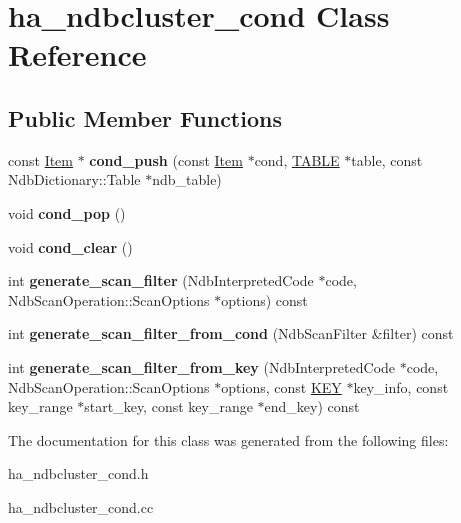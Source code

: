 \hypertarget{classha__ndbcluster__cond}{}\section{ha\+\_\+ndbcluster\+\_\+cond Class Reference}
\label{classha__ndbcluster__cond}
\subsection*{Public Member Functions}
\begin{DoxyCompactItemize}
\item 
\mbox{\label{classha__ndbcluster__cond_ae59c2d817532d16e55721ed704b60fdc}} 
const \mbox{\hyperlink{classItem}{Item}} $\ast$ {\bfseries cond\+\_\+push} (const \mbox{\hyperlink{classItem}{Item}} $\ast$cond, \mbox{\hyperlink{structTABLE}{T\+A\+B\+LE}} $\ast$table, const Ndb\+Dictionary\+::\+Table $\ast$ndb\+\_\+table)
\item 
\mbox{\label{classha__ndbcluster__cond_a492ae3d4be6468c4ab6f3a619634c87e}} 
void {\bfseries cond\+\_\+pop} ()
\item 
\mbox{\label{classha__ndbcluster__cond_a4735f773a98387b5a211580f09c86db9}} 
void {\bfseries cond\+\_\+clear} ()
\item 
\mbox{\label{classha__ndbcluster__cond_a43ef0559e01c07bc67c8c256991ad9a0}} 
int {\bfseries generate\+\_\+scan\+\_\+filter} (Ndb\+Interpreted\+Code $\ast$code, Ndb\+Scan\+Operation\+::\+Scan\+Options $\ast$options) const
\item 
\mbox{\label{classha__ndbcluster__cond_ad631c9d1eea3312afdf2eed233d138ce}} 
int {\bfseries generate\+\_\+scan\+\_\+filter\+\_\+from\+\_\+cond} (Ndb\+Scan\+Filter \&filter) const
\item 
\mbox{\label{classha__ndbcluster__cond_a2efe40a89d809bb85ac9f8d2d24479ad}} 
int {\bfseries generate\+\_\+scan\+\_\+filter\+\_\+from\+\_\+key} (Ndb\+Interpreted\+Code $\ast$code, Ndb\+Scan\+Operation\+::\+Scan\+Options $\ast$options, const \mbox{\hyperlink{structst__key}{K\+EY}} $\ast$key\+\_\+info, const key\+\_\+range $\ast$start\+\_\+key, const key\+\_\+range $\ast$end\+\_\+key) const
\end{DoxyCompactItemize}


The documentation for this class was generated from the following files\+:\begin{DoxyCompactItemize}
\item 
ha\+\_\+ndbcluster\+\_\+cond.\+h\item 
ha\+\_\+ndbcluster\+\_\+cond.\+cc\end{DoxyCompactItemize}
